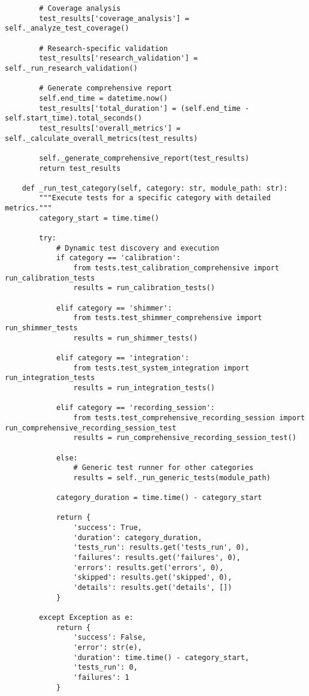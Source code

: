 \documentclass[11pt,a4paper]{article}
\begin{document}
\begin{verbatim}
        # Coverage analysis
        test_results['coverage_analysis'] = self._analyze_test_coverage()

        # Research-specific validation
        test_results['research_validation'] = self._run_research_validation()

        # Generate comprehensive report
        self.end_time = datetime.now()
        test_results['total_duration'] = (self.end_time - self.start_time).total_seconds()
        test_results['overall_metrics'] = self._calculate_overall_metrics(test_results)

        self._generate_comprehensive_report(test_results)
        return test_results

    def _run_test_category(self, category: str, module_path: str):
        """Execute tests for a specific category with detailed metrics."""
        category_start = time.time()

        try:
            # Dynamic test discovery and execution
            if category == 'calibration':
                from tests.test_calibration_comprehensive import run_calibration_tests
                results = run_calibration_tests()

            elif category == 'shimmer':
                from tests.test_shimmer_comprehensive import run_shimmer_tests
                results = run_shimmer_tests()

            elif category == 'integration':
                from tests.test_system_integration import run_integration_tests
                results = run_integration_tests()

            elif category == 'recording_session':
                from tests.test_comprehensive_recording_session import run_comprehensive_recording_session_test
                results = run_comprehensive_recording_session_test()

            else:
                # Generic test runner for other categories
                results = self._run_generic_tests(module_path)

            category_duration = time.time() - category_start

            return {
                'success': True,
                'duration': category_duration,
                'tests_run': results.get('tests_run', 0),
                'failures': results.get('failures', 0),
                'errors': results.get('errors', 0),
                'skipped': results.get('skipped', 0),
                'details': results.get('details', [])
            }

        except Exception as e:
            return {
                'success': False,
                'error': str(e),
                'duration': time.time() - category_start,
                'tests_run': 0,
                'failures': 1
            }
\end{verbatim}
\end{document}
